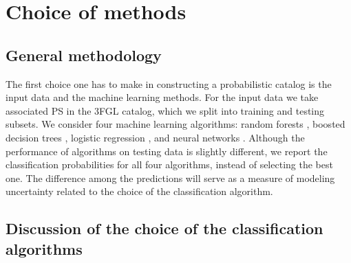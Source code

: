 \section{Choice of methods}

\subsection{General methodology}

The first choice one has to make in constructing a probabilistic catalog is the input data and the machine learning methods.
For the input data we take associated PS in the 3FGL catalog, which we split into training and testing subsets.
We consider four machine learning algorithms: random forests \citep[RF,][]{709601, Breiman:2001hzm}, 
boosted decision trees \citep[BDT,][]{friedman2001},  
logistic regression \citep[LR,][]{cox1958}, 
and neural networks \citep[NN,][]{Hopfield:1982pe}.
Although the performance of algorithms on testing data is slightly different, 
we report the classification probabilities for all four algorithms, instead of selecting the best one.
The difference among the predictions will serve as a measure of modeling uncertainty related 
to the choice of the classification algorithm.

\subsection{Discussion of the choice of the classification algorithms}

